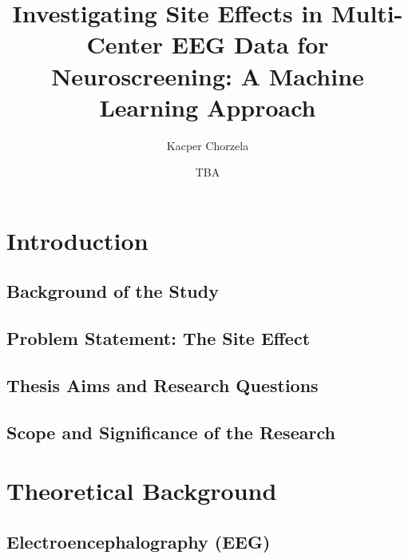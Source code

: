 \documentclass{bachelor2025eng}
\author{Kacper Chorzela}
\title{Investigating Site Effects in Multi-Center EEG Data for Neuroscreening: A Machine Learning Approach}
\date{TBA}
\begin{document}
\maketitle

\let\cleardoublepage\clearpage

\begin{abstract}
\end{abstract}

\tableofcontents

\chapter{Introduction}
    \section{Background of the Study}
        
    \section{Problem Statement: The Site Effect}
    
    \section{Thesis Aims and Research Questions}
   

    \section{Scope and Significance of the Research}

\chapter{Theoretical Background}
    \section{Electroencephalography (EEG)}
\end{document}
